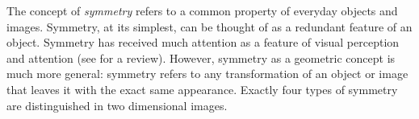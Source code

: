 The concept of \emph{symmetry} refers to a common property of everyday objects and images. Symmetry, at its simplest, can be thought of as a redundant feature of an object. Symmetry has received much attention as a feature of visual perception and attention (see \citep{review} for a review). However, symmetry as a geometric concept is much more general: symmetry refers to any transformation of an object or image that leaves it with the exact same appearance. Exactly four types of symmetry are distinguished in two dimensional images.